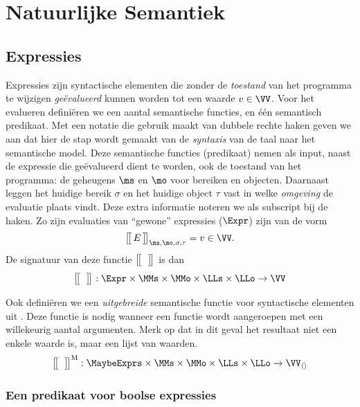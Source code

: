 \chapter{Natuurlijke Semantiek}

\section{Expressies}

Expressies zijn syntactische elementen die zonder de \emph{toestand} van het programma te wijzigen \emph{geëvalueerd} kunnen worden tot een waarde $v \in \VV$. 
Voor het evalueren definiëren we een aantal semantische functies, en één semantisch predikaat. Met een notatie die gebruik maakt van dubbele rechte haken geven we aan dat hier de stap wordt gemaakt van de \emph{syntaxis} van de taal naar het semantische model. Deze semantische functies (predikaat) nemen als input, naast de expressie die geëvalueerd dient te worden, ook de toestand van het programma: de geheugens $\ms$ en $\mo$ voor bereiken en objecten. Daarnaast leggen het huidige bereik $\sigma$ en het huidige object $\tau$ vast in welke \emph{omgeving} de evaluatie plaats vindt. Deze extra informatie noteren we als subscript bij de haken. Zo zijn evaluaties van ``gewone'' expressies ($\Expr$) zijn van de vorm
%
\begin{equation*}
  \Express{E}{\ms,\mo,\sigma,\tau} = v \in \VV.
\end{equation*}
%
De signatuur van deze functie $\big[\!\big[\,\;\,\big]\!\big]^\text{}_{}$ is dan
%
\begin{equation*}
  \Express{\;}{} : \Expr \times \MMs \times \MMo \times \LLs \times \LLo \to \VV \\
\end{equation*}

Ook definiëren we een \emph{uitgebreide} semantische functie voor syntactische elementen uit \MaybeExprs. Deze functie is nodig wanneer een functie wordt aangeroepen met een willekeurig aantal argumenten. Merk op dat in dit geval het resultaat niet een enkele waarde is, maar een lijst van waarden.
%
\begin{equation*}
  \Express[M]{\;}{} : \MaybeExprs \times \MMs \times \MMo \times \LLs \times \LLo \to \VV_{\langle\rangle}
\end{equation*}

\subsection{Een predikaat voor boolse expressies}


